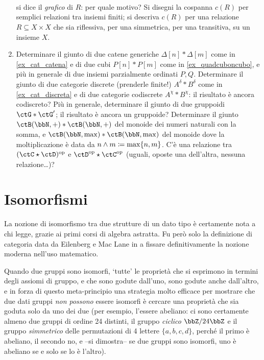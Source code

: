 \begin{enumerate}
\[\begin{tikzcd}
\end{tikzcd}
\]
si dice il \emph{grafico} di $R$: per quale motivo? Si disegni la cospanna $c(R)$ per semplici relazioni tra insiemi finiti; si descriva $c(R)$ per una relazione $R\subseteq X\times X$ che sia riflessiva, per una simmetrica, per una transitiva, su un insieme $X$.
	\item Determinare il giunto di due catene generiche \(\Delta[n] * \Delta[m]\) come in \ref{ex_cat_catena} e di due cubi \(P[n] * P[m]\) come in \ref{ex_quadcuboncubo}, e più in generale di due insiemi parzialmente ordinati \(P,Q\). Determinare il giunto di due categorie discrete (prenderle finite!) \(A^\delta * B^\delta\) come in \ref{ex_cat_discreta} e di due categorie codiscrete \(A^\chi * B^\chi\): il risultato è ancora codiscreto? Più in generale, determinare il giunto di due gruppoidi \(\ctG * \ctG'\); il risultato è ancora un gruppoide? Determinare il giunto \(\ctB(\bbN,+) * \ctB(\bbN,+)\) del monoide dei numeri naturali con la somma, e \(\ctB(\bbN,\max) * \ctB(\bbN,\max)\) del monoide dove la moltiplicazione è data da \(n\land m \coloneqq \max\{n,m\}\). C'è una relazione tra \((\ctC\star\ctD)^\op\) e \(\ctD^\op\star\ctC^\op\) (uguali, oposte una dell'altra, nessuna relazione\dots)?
\end{enumerate}
\section{Isomorfismi}\label{sec_isomorfismi}
La nozione di isomorfismo tra due strutture di un dato tipo è certamente nota a chi legge, grazie ai primi corsi di algebra astratta. Fu però solo la definizione di categoria data da Eilenberg e Mac Lane in \cite{} a fissare definitivamente la nozione moderna nell'uso matematico.

Quando due gruppi sono isomorfi, `tutte' le proprietà che si esprimono in termini degli assiomi di gruppo, e che sono godute dall'uno, sono godute anche dall'altro, e in forza di questo meta-principio una strategia molto efficace per mostrare che due dati gruppi \emph{non possono} essere isomorfi è cercare una proprietà che sia goduta solo da uno dei due (per esempio, l'essere abeliano: ci sono certamente almeno due gruppi di ordine 24 distinti, il gruppo \emph{ciclico} \(\bbZ/24\bbZ\) e il gruppo \emph{simmetrico} delle permutazioni di 4 lettere \(\{a,b,c,d\}\), perché il primo è abeliano, il secondo no, e --si dimostra-- se due gruppi sono isomorfi, uno è abeliano se e solo se lo è l'altro).

